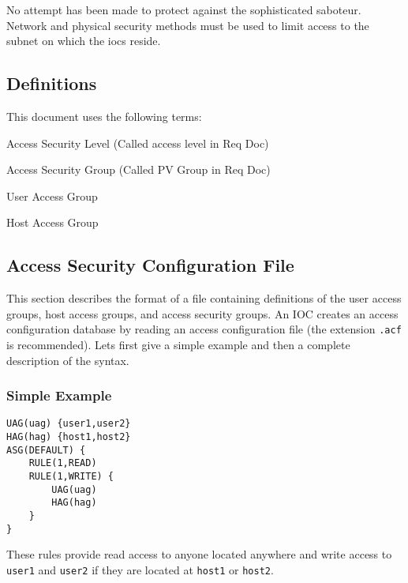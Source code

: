 No attempt has been made to protect against the sophisticated saboteur.
Network and physical security methods must be used to limit access to the subnet on which the iocs reside.

\subsection{Definitions}

This document uses the following terms:

\begin{description}
\item [ASL] Access Security Level (Called access level in Req Doc)

\item [ASG] Access Security Group (Called PV Group in Req Doc)

\item [UAG] User Access Group

\item [HAG] Host Access Group
\end{description}

\subsection{Access Security Configuration File}

This section describes the format of a file containing definitions of the user access groups, host access groups, and access 
security groups. An IOC creates an access configuration database by reading an access configuration file (the extension 
\verb|.acf| is recommended). Lets first give a simple example and then a complete description of the syntax.

\subsubsection{Simple Example}

\begin{verbatim}
UAG(uag) {user1,user2}
HAG(hag) {host1,host2}
ASG(DEFAULT) {
    RULE(1,READ)
    RULE(1,WRITE) {
        UAG(uag)
        HAG(hag)
    }
}
\end{verbatim}

These rules provide read access to anyone located anywhere and write access to \verb|user1| and \verb|user2| if they are located at 
\verb|host1| or \verb|host2|.

